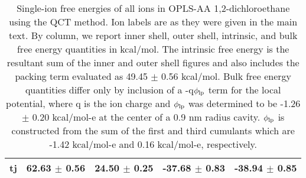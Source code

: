 \begin{table}
\begin{center}
\begin{tabular}{ccccc}
tj	&	62.63	$\pm$	0.56	&	24.50	$\pm$	0.25	&	-37.68	$\pm$	0.83	&	-38.94	$\pm$	0.85	\\
  \hline
  \hline
 \end{tabular}
 \end{center}
 \caption[Quasichemical partitioning of solvation free energies in 1,2-dichloroethane]{\label{tab:dce}Single-ion free energies of all ions in OPLS-AA 
 1,2-dichloroethane using the QCT method. Ion labels are as they were given in the main text.
 By column, we report inner shell, outer shell, intrinsic, and bulk free energy quantities in kcal/mol. The intrinsic free energy is the resultant sum of the inner 
 and outer shell figures and also includes the packing term evaluated as 49.45 $\pm$ 0.56 kcal/mol. Bulk free energy quantities differ only by inclusion of a 
 -q$\phi_{\mathrm{lp}}$ term for the local potential, where q is the ion charge and $\phi_{\mathrm{lp}}$ was determined to be -1.26 $\pm$ 0.20 kcal/mol-e at the center of a 
 0.9 nm radius cavity. $\phi_{\mathrm{lp}}$ is constructed from the sum of the first and third cumulants which are -1.42 kcal/mol-e and 0.16 kcal/mol-e, respectively.}
\end{table}